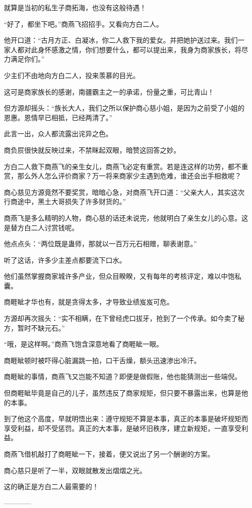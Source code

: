 \begin{this_body}
就算是当初的私生子商拓海，也没有这般待遇！

“好了，都坐下吧。”商燕飞招招手。又看向方白二人。

他开口道：“古月方正、白凝冰，你二人救下我的爱女。并把她护送过来。我们一家人都对此身怀感激之情，你们想要什么，都可以提出来，我身为商家族长，将尽力满足你们。”

少主们不由地向方白二人，投来羡慕的目光。

这可是商家族长的感谢，南疆霸主之一的承诺，份量之重，可比青山！

但方源却摇头：“族长大人，我们之所以保护商心慈小姐，是因为之前受了小姐的恩惠。恩情早已相抵，已经两清了。”

此言一出，众人都流露出诧异之色。

商负屃很快就反映过来，不禁眯起双眼，暗赞这回答之妙。

方白二人救下商燕飞的亲生女儿，商燕飞必定有重赏。若是连这样的功劳，都不重赏，那么外人怎么评价商家？万一将来商家少主遇到危难，谁还会出手相救呢？

商心慈见方源竟然不要奖赏，暗暗心急，对商燕飞开口道：“父亲大人，其实这次行商途中，黑土大哥损失了许多财货的。”

商燕飞是多么精明的人物，商心慈的话还未说完，他就明白了亲生女儿的心意。这是替方白二人讨赏钱呢。

他点点头：“两位既是蛊师，那就以一百万元石相赠，聊表谢意。”

听了这话，许多少主差点都要流下口水。

他们虽然掌握商家城许多产业，但众目睽睽，又有每年的考核评定，难以中饱私囊。

商睚眦才华也有，就是贪得太多，才导致业绩岌岌可危。

方源却再次摇头：“实不相瞒，在下曾经虎口拔牙，抢到了一个传承。如今卖了秘方，暂时不缺元石。”

“哦，是这样啊。”商燕飞饱含深意地看了商睚眦一眼。

商睚眦顿时被吓得心脏漏跳一拍，口干舌燥，额头迅速渗出冷汗。

商睚眦的事情，商燕飞又岂能不知道？即便是做假账，他也能猜测出一些端倪。

但商睚眦毕竟是自己的儿子，虽然违反了商家规矩，但只要不暴露出来，也算是他的本事。

到了他这个高度，早就明悟出来：遵守规矩不算是本事，真正的本事是破坏规矩而享受利益，却不受惩罚。真正的大本事，是破坏旧秩序，建立新规矩，一直享受利益。

商燕飞借机敲打了商睚眦一下，接着，便又说出了另一个酬谢的方案。

商心慈只是听了一半，双眼就散发出熠熠之光。

这的确正是方白二人最需要的！

------------

\end{this_body}

